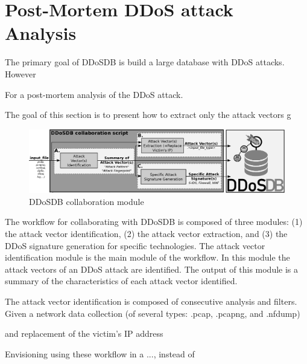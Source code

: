 \section{Post-Mortem DDoS attack Analysis}

The primary goal of DDoSDB is build a large database with DDoS attacks. However


For a post-mortem analysis of the DDoS attack.

The goal of this section is to present how to extract only the attack vectors g
 
\begin{figure}
	\includegraphics[width=\linewidth]{figs/workflow.eps}
	\caption{DDoSDB collaboration module}
	\label{fig:collaboration module}
\end{figure}

The workflow for collaborating with DDoSDB is composed of three modules: (1) the attack vector identification, (2) the attack vector extraction, and (3) the DDoS signature generation for specific technologies. The attack vector identification module is the main module of the workflow. In this module the attack vectors of an DDoS attack are identified. The output of this module is a summary of the characteristics of each attack vector identified.

The attack vector identification is composed of consecutive analysis and filters. Given a network data collection (of several types: \eg .pcap, .pcapng, and .nfdump)

and replacement of the victim's IP address

Envisioning using these workflow in a ..., instead of 